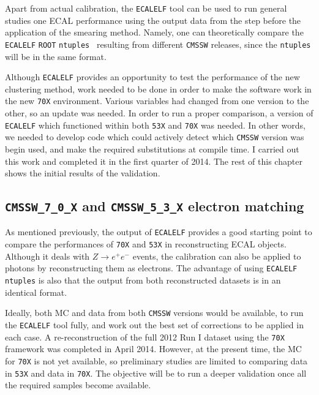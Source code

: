 \documentclass[10pt]{article}
\begin{document}
Apart from actual calibration, the \texttt{ECALELF} tool can be used to run general studies one ECAL performance using the output data from the step before the application of the smearing method. Namely, one can theoretically compare the \texttt{ECALELF} \texttt{ROOT} \texttt{ntuples}~\cite{ntuple} resulting from different \texttt{CMSSW} releases, since the \texttt{ntuples} will be in the same format.

Although \texttt{ECALELF} provides an opportunity to test the performance of the new clustering method, work needed to be done in order to make the software work in the new \texttt{70X} environment. Various variables had changed from one version to the other, so an update was needed. In order to run a proper comparison, a version of \texttt{ECALELF} which functioned within both \texttt{53X} and \texttt{70X} was needed. In other words, we needed to develop code which could actively detect which \texttt{CMSSW} version was begin used, and make the required substitutions at compile time. I carried out this work and completed it in the first quarter of 2014. The rest of this chapter shows the initial results of the validation.

\subsection{\texttt{CMSSW\_7\_0\_X} and \texttt{CMSSW\_5\_3\_X} electron matching}

As mentioned previously, the output of \texttt{ECALELF} provides a good starting point to compare the performances of \texttt{70X} and \texttt{53X} in reconstructing ECAL objects. Although it deals with $Z\rightarrow e^+ e^-$ events, the calibration can also be applied to photons by reconstructing them as electrons.%
The advantage of using \texttt{ECALELF ntuples} is also that the output from both reconstructed datasets is in an identical format.

Ideally, both MC and data from both \texttt{CMSSW} versions would be available, to run the \texttt{ECALELF} tool fully, and work out the best set of corrections to be applied in each case. A re-reconstruction of the full 2012 Run I dataset using the \texttt{70X} framework was completed in April 2014. However, at the present time, the MC for \texttt{70X} is not yet available, so preliminary studies are limited to comparing data in \texttt{53X} and data in \texttt{70X}. The objective will be to run a deeper validation once all the required samples become available.
\end{document}
